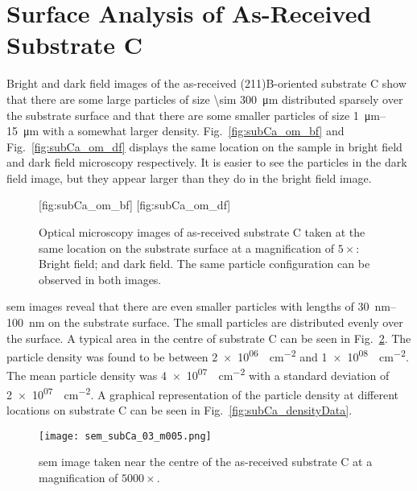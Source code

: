 \clearpage
\section{Surface Analysis of As-Received Substrate C}\label{sec:subCa}

Bright and dark field images of the as-received (211)B-oriented substrate C show that there are some large particles of size \SI{\sim 300}{\micro\metre} distributed sparsely over the substrate surface and that there are some smaller particles of size \SIrange{1}{15}{\micro\metre} with a somewhat larger density. Fig.~\ref{fig:subCa_om_bf} and Fig.~\ref{fig:subCa_om_df} displays the same location on the sample in bright field and dark field microscopy respectively. It is easier to see the particles in the dark field image, but they appear larger than they do in the bright field image.

\begin{figure}[htbp]
    \centering
    [fig:subCa_om_bf]
    \hfill
    [fig:subCa_om_df]
    \caption[Bright and dark field optical microscopy images of as-received substrate C.]{Optical microscopy images of as-received substrate C taken at the same location on the substrate surface at a magnification of $5\times$:  Bright field; and  dark field. The same particle configuration can be observed in both images.}
    \label{fig:subCa_om}
\end{figure}

\Ac{sem} images reveal that there are even smaller particles with lengths of \SIrange{30}{100}{\nano\metre} on the substrate surface. The small particles are distributed evenly over the surface. A typical area in the centre of substrate C can be seen in Fig.~\ref{fig:subCa_sem_area}. The particle density was found to be between \SI{2e+06}{\particle\centi\metre^{-2}} and \SI{1e+08}{\particle\centi\metre^{-2}}. The mean particle density was \SI{4e+07}{\particle\centi\metre^{-2}} with a standard deviation of \SI{2e+07}{\particle\centi\metre^{-2}}. A graphical representation of the particle density at different locations on substrate C can be seen in Fig.~\ref{fig:subCa_densityData}.

\begin{figure}[htbp]
    \centering
    \texttt{[image: sem\_subCa\_03\_m005.png]}
    \caption[\Ac{sem} image taken near the centre of the as-received substrate C.]{\Acf{sem} image taken near the centre of the as-received substrate C at a  magnification of $5000\times$.}
    \label{fig:subCa_sem_area}
\end{figure}

